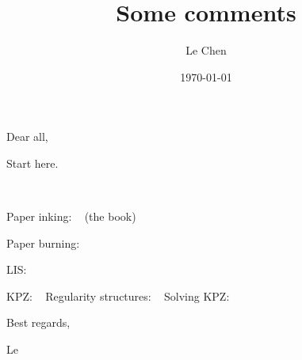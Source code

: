 \documentclass[12pt]{article} %
\title{Some comments}
\author{Le Chen}
\date{\today}
\theoremstyle{plain}
\theoremstyle{definition}
\newcommand{\<}{\langle}
\renewcommand{\>}{\rangle}
\begin{document}
\maketitle
\noindent

Dear all,
\bigskip

Start here.

\cite{family.vicsek:85:scaling}
\cite{kardar.parisi.ea:86:dynamic}
\cite{barabasi.stanley:95:fractal}
\cite{zhang.zhang.ea:92:modeling}
~\cite{takeuchi.sano.ea:11:growing}

Paper inking: ~\cite{barabasi.stanley:95:fractal} (the book)

Paper burning: ~\cite{zhang.zhang.ea:92:modeling}

LIS: ~\cite{baik.deift.ea:99:on}

KPZ: ~\cite{kardar.parisi.ea:86:dynamic}
Regularity structures: ~\cite{hairer:14:theory}
Solving KPZ: ~\cite{hairer:13:solving}

\bigskip
\noindent
Best regards,

\noindent
Le
\begingroup
\global\let\savedifeof=\ifeof
\def\ifeof#1{\global\let\ifeof=\savedifeof\iftrue}%
\printbibliography[title={References}]
\end{document}
